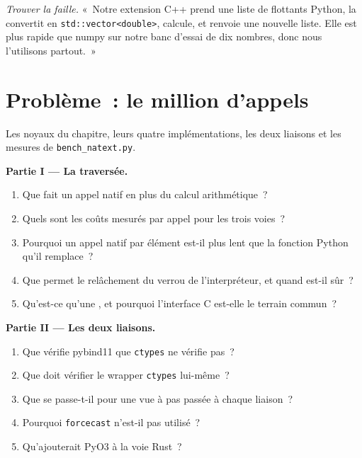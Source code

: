 \begin{exercise}[$\star\star\star$]\label{exo:pl:native-extensions:8}
\emph{Trouver la faille.} «~Notre extension C++ prend une liste de flottants Python, la convertit en \texttt{std::vector<double>}, calcule, et
renvoie une nouvelle liste. Elle est plus rapide que numpy sur notre banc d'essai de dix nombres, donc nous l'utilisons partout.~»
\end{exercise}

\section{Problème~: le million d'appels}

\begin{problem}\label{pb:pl:native-extensions:1}
Les noyaux du chapitre, leurs quatre implémentations, les deux liaisons et les mesures de \texttt{bench\_natext.py}.

\medskip\noindent\textbf{Partie I --- La traversée.}
\begin{enumerate}
\item Que fait un appel natif en plus du calcul arithmétique~?
\item Quels sont les coûts mesurés par appel pour les trois voies~?
\item Pourquoi un appel natif par élément est-il plus lent que la fonction Python qu'il remplace~?
\item Que permet le relâchement du verrou de l'interpréteur, et quand est-il sûr~?
\item Qu'est-ce qu'une , et pourquoi l'interface C est-elle le terrain commun~?
\end{enumerate}

\medskip\noindent\textbf{Partie II --- Les deux liaisons.}
\begin{enumerate}[resume]
\item Que vérifie pybind11 que \texttt{ctypes} ne vérifie pas~?
\item Que doit vérifier le wrapper \texttt{ctypes} lui-même~?
\item Que se passe-t-il pour une vue à pas passée à chaque liaison~?
\item Pourquoi \texttt{forcecast} n'est-il pas utilisé~?
\item Qu'ajouterait PyO3 à la voie Rust~?
\end{enumerate}


\end{problem}
